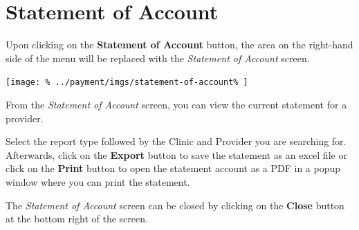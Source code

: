 \documentclass[../main/main]{subfiles}
\begin{document}
\newpage
\section{Statement of Account}
\label{sec:statement-of-account}

Upon clicking on the \textbf{Statement of Account} button,
the area on the right-hand side of the menu will be replaced with the
\emph{Statement of Account} screen.

\texttt{[image: \%
  ../payment/imgs/statement-of-account\%
]}

From the \emph{Statement of Account} screen, you can view the current
statement for a provider.

Select the report type followed by the Clinic and Provider you are
searching for. Afterwards, click on the \textbf{Export} button to save the
statement as an excel file or click on the \textbf{Print} button to open
the statement account as a PDF in a popup window where you can print the
statement.

The \emph{Statement of Account} screen can be closed by clicking on the
\textbf{Close} button at the bottom right of the screen.
\end{document}

